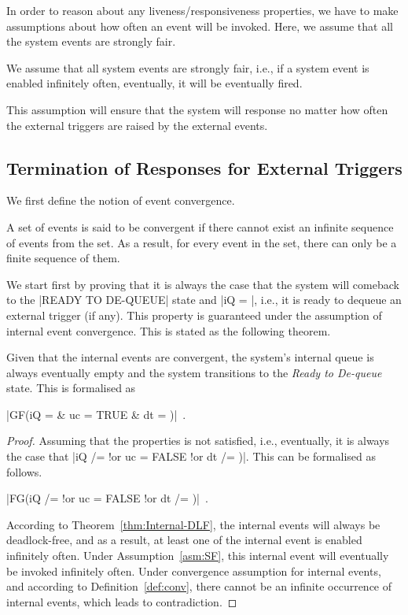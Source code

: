 In order to reason about any liveness/responsiveness properties, we
have to make assumptions about how often an event will be invoked.
Here, we assume that all the system events are strongly fair.
\begin{assumption}
  \label{asm:SF}
  We assume that all system events are strongly fair, i.e., if a system
  event is enabled infinitely often, eventually, it will be eventually
  fired.
\end{assumption}
This assumption will ensure that the system will response no matter
how often the external triggers are raised by the external events.

\subsection{Termination of Responses for External Triggers}
\label{sec:contr-rema-resp}

We first define the notion of event convergence.
\begin{definition}
  \label{def:conv}
  A set of events is said to be convergent if there cannot exist an
  infinite sequence of events from the set.  As a result, for every
  event in the set, there can only be a finite sequence of them.
\end{definition}

We start first by proving that it is always the case that the system
will comeback to the |READY TO DE-QUEUE| state and |iQ = {}|,
i.e., it is ready to dequeue an external trigger (if any).  This
property is guaranteed under the assumption of internal event
convergence.  This is stated as the following theorem.
\begin{theorem}
  \label{thm:finite-internal-events}
  Given that the internal events are convergent, the system's 
  internal queue is always eventually empty and the system transitions to the
  \emph{Ready to De-queue} state.  This is formalised as
  \begin{center}
    |GF(iQ = {} & uc = TRUE & dt = {})|~.
  \end{center}
\end{theorem}
\begin{proof}
  Assuming that the properties is not satisfied, i.e., eventually,
  it is always the case that %
  |iQ /= {} !or  uc = FALSE !or dt /=  {})|.  %
  This can be formalised as follows.
  \begin{center}
    |FG(iQ /= {} !or uc = FALSE !or dt /= {})|~.    
  \end{center}
  According to Theorem~\ref{thm:Internal-DLF}, the internal events
  will always be deadlock-free, and as a result, at least one
  of the internal event is enabled infinitely often. Under
  Assumption~\ref{asm:SF}, this internal event will eventually be
  invoked infinitely often.  Under convergence assumption for internal
  events, and according to Definition~\ref{def:conv}, there cannot be
  an infinite occurrence of internal events, which leads to
  contradiction.
\end{proof}

